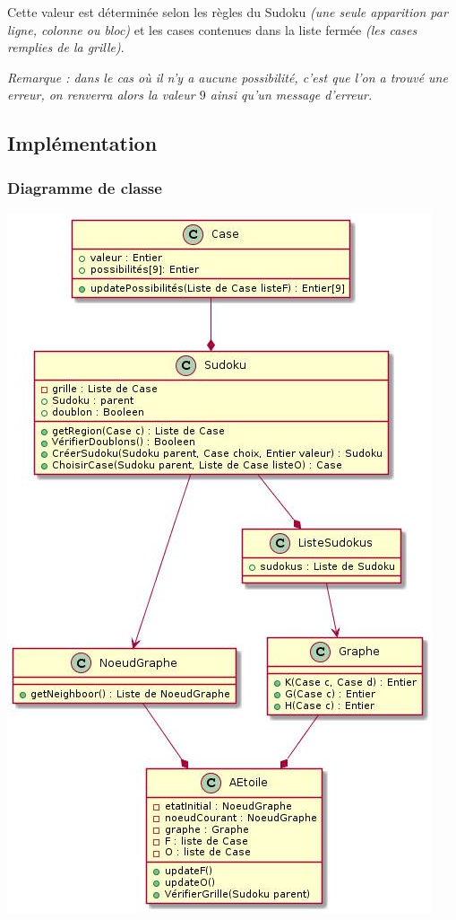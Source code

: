 Cette valeur est déterminée selon les règles du Sudoku \textit{(une seule apparition par ligne, colonne ou bloc)} et les cases contenues dans la liste fermée \textit{(les cases remplies de la grille)}.

\textit{Remarque : dans le cas où il n'y a aucune possibilité, c'est que l'on a trouvé une erreur, on renverra alors la valeur $9$ ainsi qu'un message d'erreur.}




\subsection{Implémentation}

\subsubsection{Diagramme de classe}

\includegraphics[scale = 0.5]{images/AstarDiagrammeClasse.png}

